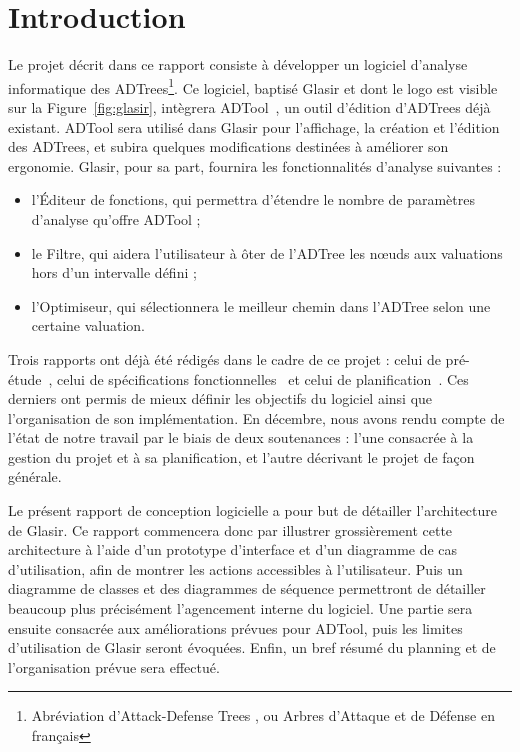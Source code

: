 \section{Introduction}
    \label{sec:intro}

    Le projet décrit dans ce rapport consiste à développer un logiciel d'analyse informatique des ADTrees\footnote{Abréviation d'\og Attack-Defense Trees \fg{}, ou \og Arbres d'Attaque et de Défense\fg{} en français}. Ce logiciel, baptisé Glasir et dont le logo est visible sur la {\sc Figure}~\ref{fig:glasir}, intègrera ADTool~\cite{ADTool}, un outil d'édition d'ADTrees déjà existant. ADTool sera utilisé dans Glasir pour l'affichage, la création et l'édition des ADTrees, et subira quelques modifications destinées à améliorer son ergonomie. Glasir, pour sa part, fournira les fonctionnalités d'analyse suivantes :

    \begin{itemize}
    	\item l'Éditeur de fonctions, qui permettra d'étendre le nombre de paramètres d'analyse qu'offre ADTool ;
    	\item le Filtre, qui aidera l'utilisateur à ôter de l'ADTree les nœuds aux valuations hors d'un intervalle défini ;
    	\item l'Optimiseur, qui sélectionnera le meilleur chemin dans l'ADTree selon une certaine valuation.
    \end{itemize} 

    Trois rapports ont déjà été rédigés dans le cadre de ce projet : celui de pré-étude~\cite{pre_etude}, celui de spécifications fonctionnelles~\cite{spec_fonc} et celui de planification~\cite{planif}. Ces derniers ont permis de mieux définir les objectifs du logiciel ainsi que l'organisation de son implémentation. En décembre, nous avons rendu compte de l'état de notre travail par le biais de deux soutenances : l'une consacrée à la gestion du projet et à sa planification, et l'autre décrivant le projet de façon générale. 

    Le présent rapport de conception logicielle a pour but de détailler l'architecture de Glasir. Ce rapport commencera donc par illustrer grossièrement cette architecture à l'aide d'un prototype d'interface et d'un diagramme de cas d'utilisation, afin de montrer les actions accessibles à l'utilisateur. Puis un diagramme de classes et des diagrammes de séquence permettront de détailler beaucoup plus précisément l'agencement interne du logiciel. Une partie sera ensuite consacrée aux améliorations prévues pour ADTool, puis les limites d'utilisation de Glasir seront évoquées. Enfin, un bref résumé du planning et de l'organisation prévue sera effectué.


